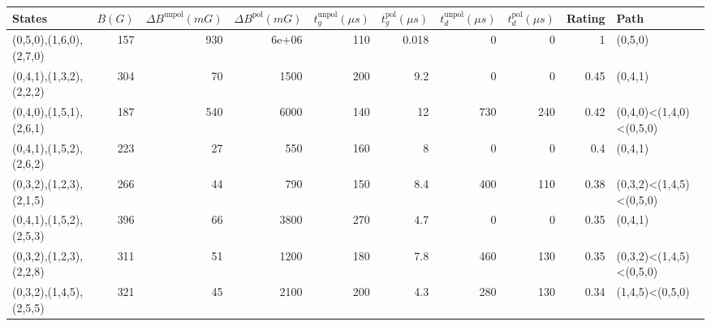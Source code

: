 \begin{tabular}{lrrrrrrrrl}
\hline
 {States}                &   {$B(G)$} &   {$\Delta B^{\text{unpol}}(mG)$} &   {$\Delta B^{\text{pol}}(mG)$} &   {$t^{\text{unpol}}_{g}(\mu s)$} &   {$t^{\text{pol}}_{g}(\mu s)$} &   {$t^{\text{unpol}}_{d}(\mu s)$} &   {$t^{\text{pol}}_{d}(\mu s)$} &   {Rating} & {Path}                  \\
\hline
 (0,5,0),(1,6,0),(2,7,0) &        157 &                               930 &                           6e+06 &                               110 &                           0.018 &                                 0 &                               0 &       1    & (0,5,0)                 \\
 (0,4,1),(1,3,2),(2,2,2) &        304 &                                70 &                        1500     &                               200 &                           9.2   &                                 0 &                               0 &       0.45 & (0,4,1)                 \\
 (0,4,0),(1,5,1),(2,6,1) &        187 &                               540 &                        6000     &                               140 &                          12     &                               730 &                             240 &       0.42 & (0,4,0)<(1,4,0)<(0,5,0) \\
 (0,4,1),(1,5,2),(2,6,2) &        223 &                                27 &                         550     &                               160 &                           8     &                                 0 &                               0 &       0.4  & (0,4,1)                 \\
 (0,3,2),(1,2,3),(2,1,5) &        266 &                                44 &                         790     &                               150 &                           8.4   &                               400 &                             110 &       0.38 & (0,3,2)<(1,4,5)<(0,5,0) \\
 (0,4,1),(1,5,2),(2,5,3) &        396 &                                66 &                        3800     &                               270 &                           4.7   &                                 0 &                               0 &       0.35 & (0,4,1)                 \\
 (0,3,2),(1,2,3),(2,2,8) &        311 &                                51 &                        1200     &                               180 &                           7.8   &                               460 &                             130 &       0.35 & (0,3,2)<(1,4,5)<(0,5,0) \\
 (0,3,2),(1,4,5),(2,5,5) &        321 &                                45 &                        2100     &                               200 &                           4.3   &                               280 &                             130 &       0.34 & (1,4,5)<(0,5,0)         \\
\hline
\end{tabular}